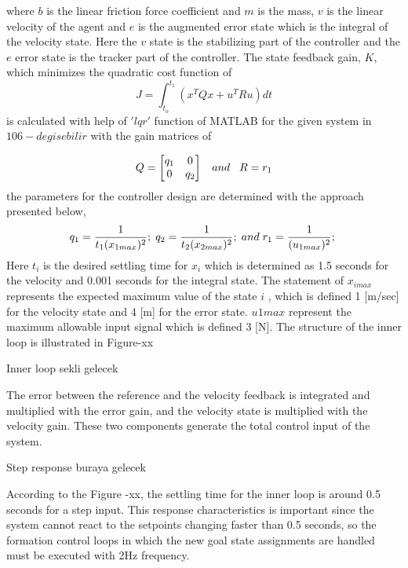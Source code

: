 \documentclass[twoside]{article}
\begin{document}
where $b$ is the linear friction force coefficient and $m$ is the mass, $v$  is the linear velocity of the agent and $e$ is the augmented error state which is the integral of the velocity state. Here the $v$ state is the stabilizing part of the controller and the $e$ error state is the tracker part of the controller. The state feedback gain, $K$, which minimizes the quadratic cost function of
\begin{equation}
 J = \int_{t_o}^{t_1}(x^TQx + u^TRu) dt
\end{equation}
is calculated with help of $'lqr'$ function of MATLAB for the given system in $106 - degisebilir$ with the gain matrices of 

\begin{equation}
 Q = \begin{bmatrix}
q_1 & 0 \\ 0 & q_2
 \end{bmatrix}
 \hspace{0.3cm} and
\hspace{0.3cm}
 R = r_1
\end{equation}
the parameters for the controller design are determined with the approach presented below,
\begin{equation}
q_1 = \frac{1}{t_1 (x_{1max})^2}; \hspace{0.1cm}
q_2 = \frac{1}{t_2 (x_{2max})^2}; \hspace{0.1cm} and \hspace{0.1cm}
r_1 = \frac{1}{ (u_{1max})^2}; \hspace{0.1cm}
\end{equation}
Here $t_i$  is the desired settling time for $x_i$ which is determined as 1.5 seconds for the velocity and 0.001 seconds for the integral state. The statement of $x_{imax}$ represents the expected maximum value of the state $i$ , which is defined 1 [m/sec] for the velocity state and 4 [m] for the error state. $u{1max}$ represent the maximum allowable input signal which is defined 3 [N]. The structure of the inner loop is illustrated in Figure-xx

Inner loop sekli gelecek

The error between the reference and the velocity feedback is integrated and multiplied with the error gain, and the velocity state is multiplied with the velocity gain. These two components generate the total control input of the system.  

Step response buraya gelecek

According to the Figure -xx, the settling time for the inner loop is around 0.5 seconds for a step input. This response characteristics is important since the system cannot react to the setpoints changing faster than 0.5 seconds, so the formation control loops in which the new goal state assignments are handled must be executed with 2Hz frequency. 
\end{document}
